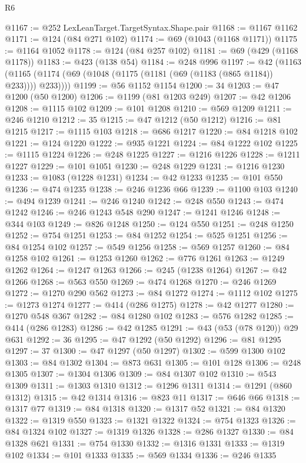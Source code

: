 \begin{lexlean}{R6}
\begin{coremodule}
@1167 := @252 LexLeanTarget.TargetSyntax.Shape.pair
@1168 := @1167 @1162
@1171 := @124 (@84 @271 @102)
@1174 := @69 (@1043 (@1168 @1171))
@1175 := @1164 @1052
@1178 := @124 (@84 @257 @102)
@1181 := @69 (@429 (@1168 @1178))
@1183 := @423 (@138 @54)
@1184 := @248 @996
@1197 := @42
    (@1163 (@1165 (@1174 (@69 (@1048 (@1175 (@1181 (@69 (@1183 (@865 @1184)) @233)))) @233))))
@1199 := @56 @1152 @1154
@1200 := 34
@1203 := @47 @1200 (@50 @1200)
@1206 := @1199 (@81 @1203 @249)
@1207 := @42 @1206
@1208 := @1115 @102
@1209 := @101 @1208
@1210 := @569 @1209
@1211 := @246 @1210
@1212 := 35
@1215 := @47 @1212 (@50 @1212)
@1216 := @81 @1215
@1217 := @1115 @103
@1218 := @686 @1217
@1220 := @84 @1218 @102
@1221 := @124 @1220
@1222 := @935 @1221
@1224 := @84 @1222 @102
@1225 := @1115 @1224
@1226 := @248 @1225
@1227 := @1216 @1226
@1228 := @1211 @1227
@1229 := @101 @1051
@1230 := @248 @1229
@1231 := @1216 @1230
@1233 := @1083 (@1228 @1231)
@1234 := @42 @1233
@1235 := @101 @550
@1236 := @474 @1235
@1238 := @246 @1236 @66
@1239 := @1100 @103
@1240 := @494 @1239
@1241 := @246 @1240
@1242 := @248 @550
@1243 := @474 @1242
@1246 := @246 @1243 @548 @290
@1247 := @1241 @1246
@1248 := @344 @103
@1249 := @826 @1248
@1250 := @124 @550
@1251 := @248 @1250
@1252 := @754 @1251
@1253 := @84 @1252
@1254 := @525 @1251
@1256 := @84 @1254 @102
@1257 := @549 @1256
@1258 := @569 @1257
@1260 := @84 @1258 @102
@1261 := @1253 @1260
@1262 := @776 @1261
@1263 := @1249 @1262
@1264 := @1247 @1263
@1266 := @245 (@1238 @1264)
@1267 := @42 @1266
@1268 := @563 @550
@1269 := @474 @1268
@1270 := @246 @1269
@1272 := @1270 @290 @562
@1273 := @84 @1272
@1274 := @1112 @102
@1275 := @1273 @1274
@1277 := @414 (@286 @1275)
@1278 := @42 @1277
@1280 := @1270 @548 @367
@1282 := @84 @1280 @102
@1283 := @576 @1282
@1285 := @414 (@286 @1283)
@1286 := @42 @1285
@1291 := @43 (@53 (@78 @120)) @29 @631
@1292 := 36
@1295 := @47 @1292 (@50 @1292)
@1296 := @81 @1295
@1297 := 37
@1300 := @47 @1297 (@50 @1297)
@1302 := @599 @1300 @102
@1303 := @84 @1302
@1304 := @873 @631
@1305 := @101 @128
@1306 := @248 @1305
@1307 := @1304 @1306
@1309 := @84 @1307 @102
@1310 := @543 @1309
@1311 := @1303 @1310
@1312 := @1296 @1311
@1314 := @1291 (@860 @1312)
@1315 := @42 @1314
@1316 := @823 @11
@1317 := @646 @66
@1318 := @1317 @77
@1319 := @84 @1318
@1320 := @1317 @52
@1321 := @84 @1320
@1322 := @1319 @550
@1323 := @1321 @1322
@1324 := @754 @1323
@1326 := @84 @1324 @102
@1327 := @1319 @1326
@1328 := @286 @1327
@1330 := @84 @1328 @621
@1331 := @754 @1330
@1332 := @1316 @1331
@1333 := @1319 @102
@1334 := @101 @1333
@1335 := @569 @1334
@1336 := @246 @1335

\end{coremodule}
\end{lexlean}
